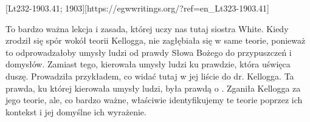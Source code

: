 [Lt232-1903.41; 1903][https://egwwritings.org/?ref=en\_Lt323-1903.41]

To bardzo ważna lekcja i zasada, której uczy nas tutaj siostra White. Kiedy zrodził się spór wokół teorii Kellogga, nie zagłębiała się w same teorie, ponieważ to odprowadzałoby umysły ludzi od prawdy Słowa Bożego do przypuszczeń i domysłów. Zamiast tego, kierowała umysły ludzi ku prawdzie, która uświęca duszę. Prowadziła przykładem, co widać tutaj w jej liście do dr. Kellogga. Ta prawda, ku której kierowała umysły ludzi, była prawdą o . Zganiła Kellogga za jego teorie, ale, co bardzo ważne, właściwie identyfikujemy te teorie poprzez ich kontekst i jej domyślne ich wyrażenie.

